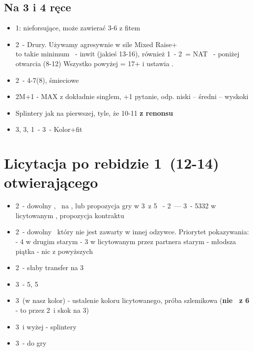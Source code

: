 \documentclass[12pt, a4paper]{article}
\begin{document}
\subsection{Na 3 i 4 ręce}
\begin{itemize}
    \item 1\nt: nieforsujące, może zawierać 3-6 z fitem
    \item 2\clubs\ - Drury. Używamy agresywnie w sile Mixed Raise+ \\
         to takie minimum
    \diams\ - inwit (jakieś 13-16), również 1\spades\ - 2\hearts\ = NAT 
    \major\ - poniżej otwarcia (8-12)
    \subitem Wszystko powyżej = 17+ i ustawia \gf.
    \item 2\major\ - 4-7(8), śmieciowe
    \item 2M+1 - MAX z dokładnie singlem, +1 pytanie, odp. niski -- średni -- wyskoki
    \item Splintery jak na pierwszej, tyle, że 10-11 \textbf{z renonsu}
    \item 3\clubs, 3\diams, 1\spades\ - 3\hearts\ - Kolor+fit
\end{itemize}


\pagebreak


\section{Licytacja po rebidzie 1\ntx\ (12-14) otwierającego}
\begin{itemize}
    \item 2\clubs\ - dowolny \inv, \soff\ na \diams, lub propozycja gry w 3\nt\ z 5\major
    \clubs\ - 2\diams\ --- 3\nt\ - 5332 w licytowanym \major, propozycja kontraktu
    \item 2\diams\ - dowolny \gf\, który nie jest zawarty w innej odzywce.
    Priorytet pokazywania:
    \subitem - 4 w drugim starym
    \subitem - 3 w licytowanym przez partnera starym
    \subitem - młodsza piątka
    \subitem - nic z powyższych
    \item 2\nt\ - słaby transfer na 3\clubs
    \item 3\minor\ - 5\major, 5\minor\ \gf\
    \item 3\hearts\ (w nasz kolor) - ustalenie koloru licytowanego, próba szlemikowa
        (\textbf{nie \inv\ z 6} - to przez 2\clubs\ i skok na 3\major)
    \item 3\spades\ i wyżej - splintery
    \item 3\nt\ - do gry
\end{itemize}
\end{document}
